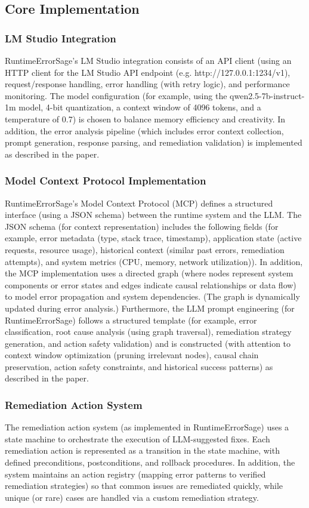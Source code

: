 \subsection{Core Implementation}

\subsubsection{LM Studio Integration}
RuntimeErrorSage's LM Studio integration consists of an API client (using an HTTP client for the LM Studio API endpoint (e.g. http://127.0.0.1:1234/v1), request/response handling, error handling (with retry logic), and performance monitoring. The model configuration (for example, using the qwen2.5-7b-instruct-1m model, 4-bit quantization, a context window of 4096 tokens, and a temperature of 0.7) is chosen to balance memory efficiency and creativity. In addition, the error analysis pipeline (which includes error context collection, prompt generation, response parsing, and remediation validation) is implemented as described in the paper.

\subsubsection{Model Context Protocol Implementation}
RuntimeErrorSage's Model Context Protocol (MCP) defines a structured interface (using a JSON schema) between the runtime system and the LLM. The JSON schema (for context representation) includes the following fields (for example, error metadata (type, stack trace, timestamp), application state (active requests, resource usage), historical context (similar past errors, remediation attempts), and system metrics (CPU, memory, network utilization)). In addition, the MCP implementation uses a directed graph (where nodes represent system components or error states and edges indicate causal relationships or data flow) to model error propagation and system dependencies. (The graph is dynamically updated during error analysis.) Furthermore, the LLM prompt engineering (for RuntimeErrorSage) follows a structured template (for example, error classification, root cause analysis (using graph traversal), remediation strategy generation, and action safety validation) and is constructed (with attention to context window optimization (pruning irrelevant nodes), causal chain preservation, action safety constraints, and historical success patterns) as described in the paper.

\subsubsection{Remediation Action System}
The remediation action system (as implemented in RuntimeErrorSage) uses a state machine to orchestrate the execution of LLM-suggested fixes. Each remediation action is represented as a transition in the state machine, with defined preconditions, postconditions, and rollback procedures. In addition, the system maintains an action registry (mapping error patterns to verified remediation strategies) so that common issues are remediated quickly, while unique (or rare) cases are handled via a custom remediation strategy.


